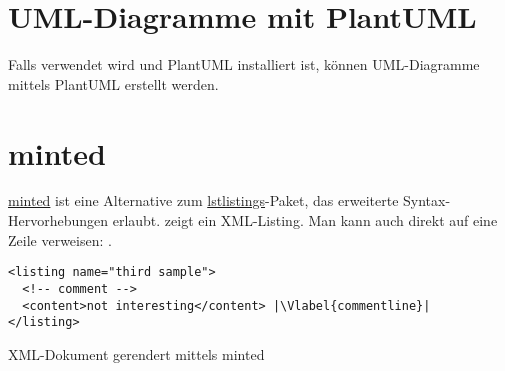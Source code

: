 
\section{UML-Diagramme mit PlantUML}

Falls \lualatex{} verwendet wird und PlantUML installiert ist, können UML-Diagramme mittels PlantUML erstellt werden.

\ifluatex
\fi

\section{minted}

\href{https://github.com/gpoore/minted}{minted} ist eine Alternative zum \href{https://ctan.org/pkg/listings}{lstlistings}-Paket, das erweiterte Syntax-Hervorhebungen erlaubt.
 zeigt ein XML-Listing.
Man kann auch direkt auf eine Zeile verweisen: .

\begin{Listing}[hb]
  \begin{verbatim}
<listing name="third sample">
  <!-- comment -->
  <content>not interesting</content> |\Vlabel{commentline}|
</listing>
\end{verbatim}
  \caption{XML-Dokument gerendert mittels minted}
  \label{lst:xml}
\end{Listing}
